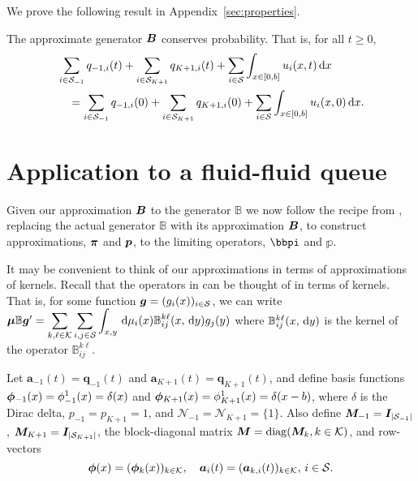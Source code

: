 
We prove the following result in Appendix~\ref{sec:properties}.
\begin{cor} \label{cor: googgy}
	The approximate generator \( \boldsymbol B\) conserves probability. That is, for all \(t\geq 0\),
	\begin{align*}
	\begin{multlined}[t]\sum_{i\in\calS_{-1}}q_{{-1},i}(t)+\sum_{i\in\calS_{K+1}}q_{{K+1},i}(t)+\sum_{i\in\calS} \int_{x\in[0,b]}u_i(x,t)\wrt x 
	\\= \sum_{i\in\calS_{-1}}q_{{-1},i}(0)+\sum_{i\in\calS_{K+1}}q_{{K+1},i}(0)+\sum_{i\in\calS} \int_{x\in[0,b]}u_i(x,0)\wrt x.\end{multlined}
	\end{align*}
\end{cor}


\section{Application to a fluid-fluid queue}\label{sec:DGSFFM}
Given our approximation \(\boldsymbol B\) to the generator \(\mathbb B\) we now follow the recipe from \cite{bo2014}, replacing the actual generator \(\mathbb B\) with its approximation \({  \boldsymbol B}\), to construct approximations, \(\boldsymbol \pi\) and \(\boldsymbol p\), to the limiting operators, \(\bbpi\) and \(\mathbb p\).

It may be convenient to think of our approximations in terms of approximations of kernels. Recall that the operators in \citep{bo2014} can be thought of in terms of kernels. That is, for some function \(\boldsymbol g = (g_i(x))_{i\in\mathcal{S}}\), we can write \(\boldsymbol \mu \mathbb B \boldsymbol g'{} = \displaystyle \sum\limits_{k,\ell\in\mathcal K}\sum\limits_{i,j\in\mathcal{S}} \displaystyle \int_{x,y}\, \mathrm{d} \mu_i(x) \mathbb B_{ij}^{k\ell}(x,\, \mathrm{d} y)g_j(y)\) where \(\mathbb B_{ij}^{k\ell}(x,\, \mathrm{d} y)\) is the kernel of the operator \(\mathbb B_{ij}^{k\ell}\). 

Let \(\boldsymbol a_{-1}(t)=\boldsymbol q_{-1}(t)\) and \(\boldsymbol a_{K+1}(t)=\boldsymbol q_{K+1}(t)\), and define basis functions \(\boldsymbol\phi_{-1}(x) = \phi_{-1}^1(x) = \delta(x)\) and \(\boldsymbol\phi_{K+1}(x) = \phi_{K+1}^1(x) = \delta(x-b)\), where \(\delta\) is the Dirac delta, \(p_{-1} = p_{K+1} = 1\), and \(\mathcal N_{-1} = \mathcal N_{K+1} = \{1\}\). Also define \({\boldsymbol M}_{-1}=\boldsymbol I_{|\mathcal{S}_{-1}|}\), \({\boldsymbol M}_{K+1}=\boldsymbol I_{|\mathcal{S}_{K+1}|}\), the block-diagonal matrix \(\boldsymbol M=\mathrm{diag}(\boldsymbol M_k,k\in\mathcal K)\), and row-vectors 
\[\boldsymbol \phi(x) = (\boldsymbol\phi_k(x))_{k\in\mathcal K}, \quad \boldsymbol a_i(t) = (\boldsymbol a_{k,i}(t))_{k\in\mathcal K},\,i\in\mathcal{S}.\]

